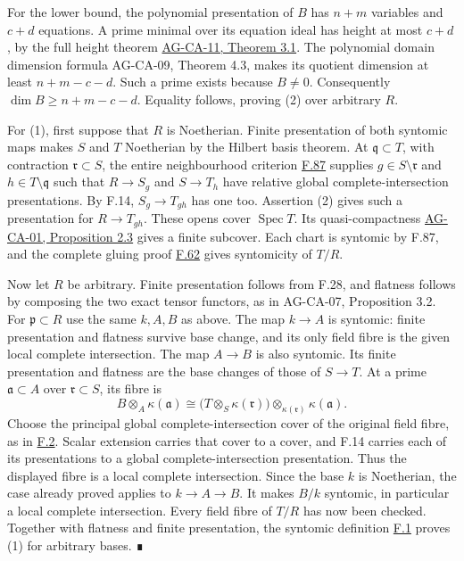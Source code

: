 \documentclass[11pt,a4paper,openany]{report}
\begin{document}
For the lower bound, the polynomial presentation of \(B\) has \(n+m\) variables and \(c+d\) equations. A prime minimal over its equation ideal has height at most \(c+d\), by the full height theorem \href{https://github.com/KokunoYumeto/open-math-courses/blob/d02d0a3669f42579db037cd44de1d113fdd770a1/docs/courses/AG-CA/src/dimension-theory-of-noetherian-local-rings.md}{AG-CA-11, Theorem 3.1}. The polynomial domain dimension formula AG-CA-09, Theorem 4.3, makes its quotient dimension at least \(n+m-c-d\). Such a prime exists because \(B\ne0\). Consequently \(\dim B\geq n+m-c-d\). Equality follows, proving (2) over arbitrary \(R\).

For (1), first suppose that \(R\) is Noetherian. Finite presentation of both syntomic maps makes \(S\) and \(T\) Noetherian by the Hilbert basis theorem. At \(\mathfrak q\subset T\), with contraction \(\mathfrak r\subset S\), the entire neighbourhood criterion \hyperref[AG-RG-S05-algebra-lemma-syntomic]{F.87} supplies \(g\in S\setminus\mathfrak r\) and \(h\in T\setminus\mathfrak q\) such that \(R\to S_g\) and \(S\to T_h\) have relative global complete-intersection presentations. By F.14, \(S_g\to T_{gh}\) has one too. Assertion (2) gives such a presentation for \(R\to T_{gh}\). These opens cover \(\operatorname{Spec}T\). Its quasi-compactness \href{https://github.com/KokunoYumeto/open-math-courses/blob/d02d0a3669f42579db037cd44de1d113fdd770a1/docs/courses/AG-CA/src/spectra-of-rings.md}{AG-CA-01, Proposition 2.3} gives a finite subcover. Each chart is syntomic by F.87, and the complete gluing proof \hyperref[AG-RG-S05-algebra-lemma-local-syntomic]{F.62} gives syntomicity of \(T/R\).

Now let \(R\) be arbitrary. Finite presentation follows from F.28, and flatness follows by composing the two exact tensor functors, as in AG-CA-07, Proposition 3.2. For \(\mathfrak p\subset R\) use the same \(k,A,B\) as above. The map \(k\to A\) is syntomic: finite presentation and flatness survive base change, and its only field fibre is the given local complete intersection. The map \(A\to B\) is also syntomic. Its finite presentation and flatness are the base changes of those of \(S\to T\). At a prime \(\mathfrak a\subset A\) over \(\mathfrak r\subset S\), its fibre is \[B\otimes_A\kappa(\mathfrak a)
\cong\bigl(T\otimes_S\kappa(\mathfrak r)\bigr)
\otimes_{\kappa(\mathfrak r)}\kappa(\mathfrak a).\] Choose the principal global complete-intersection cover of the original field fibre, as in \hyperref[AG-RG-S05-algebra-definition-lci-field]{F.2}. Scalar extension carries that cover to a cover, and F.14 carries each of its presentations to a global complete-intersection presentation. Thus the displayed fibre is a local complete intersection. Since the base \(k\) is Noetherian, the case already proved applies to \(k\to A\to B\). It makes \(B/k\) syntomic, in particular a local complete intersection. Every field fibre of \(T/R\) has now been checked. Together with flatness and finite presentation, the syntomic definition \hyperref[AG-RG-S05-algebra-definition-lci]{F.1} proves (1) for arbitrary bases. ∎
\end{document}
